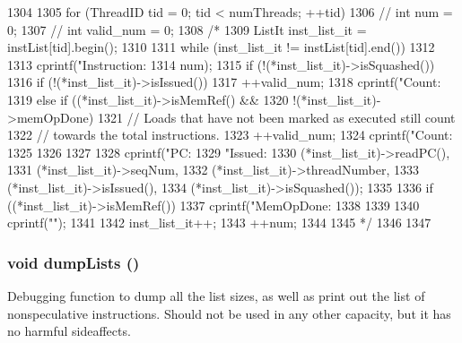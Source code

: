 \begin{DoxyCode}
1304 {
1305     for (ThreadID tid = 0; tid < numThreads; ++tid) {
1306 //        int num = 0;
1307 //        int valid_num = 0;
1308 /*
1309       ListIt inst_list_it = instList[tid].begin();
1310 
1311         while (inst_list_it != instList[tid].end())
1312         {
1313             cprintf("Instruction:%
1314                     num);
1315             if (!(*inst_list_it)->isSquashed()) {
1316                 if (!(*inst_list_it)->isIssued()) {
1317                     ++valid_num;
1318                     cprintf("Count:%
1319                 } else if ((*inst_list_it)->isMemRef() &&
1320                            !(*inst_list_it)->memOpDone) {
1321                     // Loads that have not been marked as executed still count
1322                     // towards the total instructions.
1323                     ++valid_num;
1324                     cprintf("Count:%
1325                 }
1326             }
1327 
1328             cprintf("PC:%
1329                     "Issued:%
1330                     (*inst_list_it)->readPC(),
1331                     (*inst_list_it)->seqNum,
1332                     (*inst_list_it)->threadNumber,
1333                     (*inst_list_it)->isIssued(),
1334                     (*inst_list_it)->isSquashed());
1335 
1336             if ((*inst_list_it)->isMemRef()) {
1337                 cprintf("MemOpDone:%
1338             }
1339 
1340             cprintf("\n");
1341 
1342             inst_list_it++;
1343             ++num;
1344         }
1345 */
1346     }
1347 }
\end{DoxyCode}
\hypertarget{classInstQueue_a3d1dae45e8e0b5cf7c1f4f8c796d070e}{
\subsubsection[{dumpLists}]{\setlength{\rightskip}{0pt plus 5cm}void dumpLists ()}}
\label{classInstQueue_a3d1dae45e8e0b5cf7c1f4f8c796d070e}
Debugging function to dump all the list sizes, as well as print out the list of nonspeculative instructions. Should not be used in any other capacity, but it has no harmful sideaffects. 


